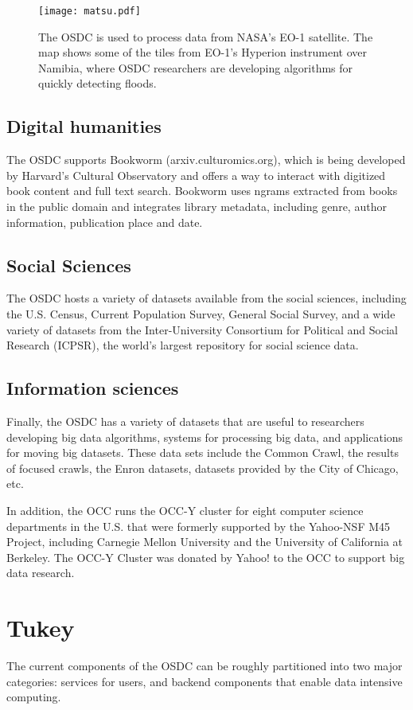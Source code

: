 \documentclass[11pt,twocolumn]{article}
\begin{document}
\begin{figure}
\centering
\texttt{[image: matsu.pdf]}
\caption{The OSDC is used to process data from NASA's EO-1 satellite.
The map shows some of the tiles from EO-1's Hyperion instrument over
Namibia, where OSDC researchers are developing algorithms for quickly
detecting floods.}
\label{figure:matsu}
\end{figure}

\subsection{Digital humanities}  The OSDC supports Bookworm
(arxiv.culturomics.org), which is being developed by Harvard's
Cultural Observatory and offers a way to interact with digitized book
content and full text search. Bookworm uses ngrams extracted from
books in the public domain and integrates library metadata, including
genre, author information, publication place and date.

\subsection{Social Sciences}  
The OSDC hosts a variety of datasets available from the
social sciences, including the U.S. Census, Current Population Survey,
General Social Survey, and a wide variety of datasets from the
Inter-University Consortium for Political and Social Research (ICPSR),
the world’s largest repository for social science data. 

\subsection{Information sciences}  Finally, the OSDC has a variety of
datasets that are useful to researchers developing big data
algorithms, systems for processing big data, and applications for
moving big datasets.  These data sets include the Common Crawl, 
the results of focused crawls, the Enron datasets, datasets provided
by the City of Chicago, etc.

In addition, the OCC runs the OCC-Y cluster for eight computer science
departments in the U.S. that were formerly supported by the Yahoo-NSF
M45 Project, including Carnegie Mellon University and the University
of California at Berkeley.   The OCC-Y Cluster was donated by Yahoo!
to the OCC to support big data research.


\section{Tukey}
The current components of the OSDC can be roughly partitioned into two
major categories: services for users, and backend components that
enable data intensive computing.
\end{document}
